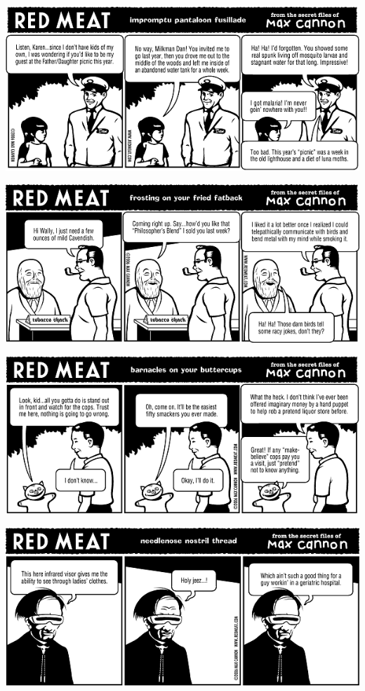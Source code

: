 \documentclass[a4paper,twoside,11pt]{article}
\begin{document}
\includegraphics[width=\textwidth]{redmeat_2006-06-06.png}



\includegraphics[width=\textwidth]{redmeat_2006-06-13.png}



\includegraphics[width=\textwidth]{redmeat_2006-06-20.png}



\includegraphics[width=\textwidth]{redmeat_2006-06-27.png}
\end{document}

